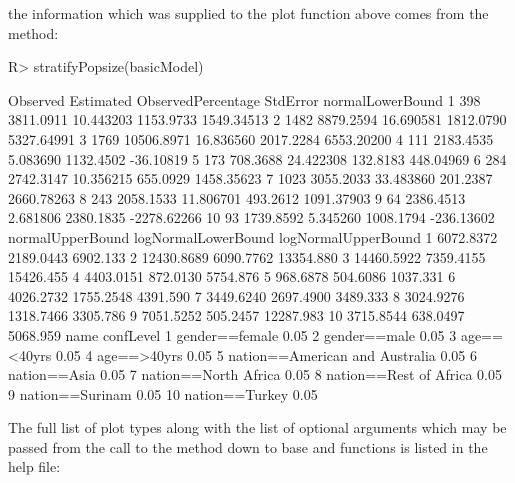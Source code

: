 \documentclass[
]{jss}
\newcommand{\1}{\mathcal{I}} \newcommand{\bZero}{\boldsymbol{0}}
\begin{document}
the information which was supplied to the plot function above comes from
the  method: \small

\begin{CodeChunk}
\begin{CodeInput}
R> stratifyPopsize(basicModel)
\end{CodeInput}
\begin{CodeOutput}
   Observed  Estimated ObservedPercentage  StdError normalLowerBound
1       398  3811.0911          10.443203 1153.9733       1549.34513
2      1482  8879.2594          16.690581 1812.0790       5327.64991
3      1769 10506.8971          16.836560 2017.2284       6553.20200
4       111  2183.4535           5.083690 1132.4502        -36.10819
5       173   708.3688          24.422308  132.8183        448.04969
6       284  2742.3147          10.356215  655.0929       1458.35623
7      1023  3055.2033          33.483860  201.2387       2660.78263
8       243  2058.1533          11.806701  493.2612       1091.37903
9        64  2386.4513           2.681806 2380.1835      -2278.62266
10       93  1739.8592           5.345260 1008.1794       -236.13602
   normalUpperBound logNormalLowerBound logNormalUpperBound
1         6072.8372           2189.0443            6902.133
2        12430.8689           6090.7762           13354.880
3        14460.5922           7359.4155           15426.455
4         4403.0151            872.0130            5754.876
5          968.6878            504.6086            1037.331
6         4026.2732           1755.2548            4391.590
7         3449.6240           2697.4900            3489.333
8         3024.9276           1318.7466            3305.786
9         7051.5252            505.2457           12287.983
10        3715.8544            638.0497            5068.959
                             name confLevel
1                  gender==female      0.05
2                    gender==male      0.05
3                     age==<40yrs      0.05
4                     age==>40yrs      0.05
5  nation==American and Australia      0.05
6                    nation==Asia      0.05
7            nation==North Africa      0.05
8          nation==Rest of Africa      0.05
9                 nation==Surinam      0.05
10                 nation==Turkey      0.05
\end{CodeOutput}
\end{CodeChunk}

\normalsize

The full list of plot types along with the list of optional arguments
which may be passed from the call to the  method down to base
 and  functions is listed in the help file:
\end{document}
